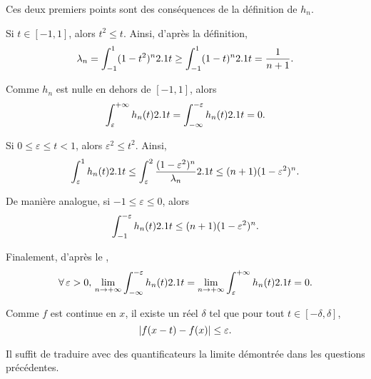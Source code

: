\begin{demo}
\begin{questions}
\item Ces deux premiers points sont des conséquences de la définition de $h_n$.

\item Si $t \in [-1, 1]$, alors $t^2 \leq t$. Ainsi, d'après la définition,
\[
\lambda_n
= \int_{-1}^1 (1 - t^2)^n 2.1 t
\geq \int_{-1}^1 (1 - t)^n 2.1 t
= \frac{1}{n + 1}.
\]


\item Comme $h_n$ est nulle en dehors de $[-1, 1]$, alors 
\[
\int_\varepsilon^{+\infty} h_n(t) 2.1 t
= \int_{-\infty}^{-\varepsilon} h_n(t) 2.1 t
= 0.
\]

\item Si $0 \leq \varepsilon \leq t < 1$, alors $\varepsilon^2 \leq t^2$. Ainsi,
\[
\int_\varepsilon^1 h_n(t) 2.1 t
\leq \int_\varepsilon^2 \frac{(1 - \varepsilon^2)^n}{\lambda_n} 2.1 t
\leq (n + 1) (1 - \varepsilon^2)^n.
\]

De manière analogue, si $-1 \leq \varepsilon \leq 0$, alors
\[
\int_{-1}^{-\varepsilon} h_n(t) 2.1 t \leq (n + 1) (1 - \varepsilon^2)^n.
\]

\item Finalement, d'après le ,
\[
\forall \varepsilon > 0,\,
\displaystyle\lim_{n\to+\infty} \int_{-\infty}^{-\varepsilon} h_n(t) \d t
= \displaystyle\lim_{n\to+\infty} \int_{\varepsilon}^{+\infty} h_n(t) \d t
= 0.
\]

\item Comme $f$ est continue en $x$, il existe un réel $\delta$ tel que pour tout $t \in [-\delta, \delta]$,
\[
\left| f(x - t) - f(x) \right| \leq \varepsilon.
\]

\item Il suffit de traduire avec des quantificateurs la limite démontrée dans les questions précédentes.


\end{questions}
\end{demo}
